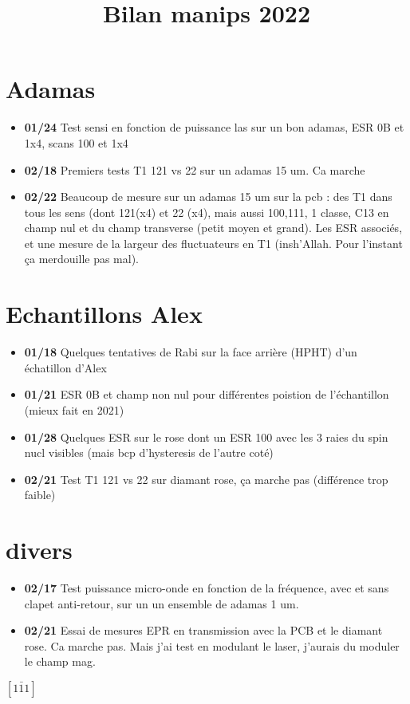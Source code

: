 \documentclass[a4paper]{article}
\title{Bilan manips 2022}
\begin{document}
\maketitle
\section{Adamas}
\begin{itemize}
\item \textbf{01/24} Test sensi en fonction de puissance las sur un bon adamas, ESR 0B et 1x4, scans 100 et 1x4
\item \textbf{02/18} Premiers tests T1 121 vs 22 sur un adamas 15 um. Ca marche
\item \textbf{02/22} Beaucoup de mesure sur un adamas 15 um sur la pcb : des T1 dans tous les sens (dont 121(x4) et 22 (x4), mais aussi 100,111, 1 classe, C13 en champ nul et du champ transverse (petit moyen et grand). Les ESR associés, et une mesure de la largeur des fluctuateurs en T1 (insh'Allah. Pour l'instant ça merdouille pas mal).
\end{itemize}
\section{Echantillons Alex}
\begin{itemize}
\item \textbf{01/18} Quelques tentatives de Rabi sur la face arrière (HPHT) d'un échatillon d'Alex
\item \textbf{01/21} ESR 0B et champ non nul pour différentes poistion de l'échantillon (mieux fait en 2021)
\item \textbf{01/28} Quelques ESR sur le rose dont un ESR 100 avec les 3 raies du spin nucl visibles (mais bcp d'hysteresis de l'autre coté)
\item \textbf{02/21} Test T1 121 vs 22 sur diamant rose, ça marche pas (différence trop faible)
\end{itemize}
\section{divers}
\begin{itemize}
\item \textbf{02/17} Test puissance micro-onde en fonction de la fréquence, avec et sans clapet anti-retour, sur un un ensemble de adamas 1 um.
\item \textbf{02/21} Essai de mesures EPR en transmission avec la PCB et le diamant rose. Ca marche pas. Mais j'ai test en modulant le laser, j'aurais du moduler le champ mag.
\end{itemize}
$\left[1 \bar 1 1 \right]$
\end{document}
